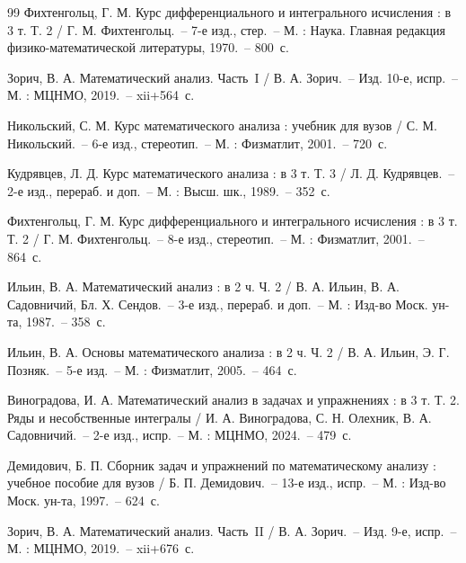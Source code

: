\documentclass[coursework, och, times]{SCWorks1}
\begin{document}
%

\begin{thebibliography}{99}
Фихтенгольц, Г. М. Курс дифференциального и интегрального исчисления : в 3 т. Т. 2 / Г. М. Фихтенгольц.~-- 7-е изд., стер.~-- М. : Наука. Главная редакция физико-математической литературы, 1970.~-- 800~с.

Зорич, В. А. Математический анализ. Часть~I / В. А. Зорич.~-- Изд. 10-е, испр.~-- М. : МЦНМО, 2019.~-- xii+564~с.

Никольский, С. М. Курс математического анализа : учебник для вузов / С. М. Никольский.~-- 6-е изд., стереотип.~-- М. : Физматлит, 2001.~-- 720~с.

Кудрявцев, Л. Д. Курс математического анализа : в 3 т. Т. 3 / Л. Д. Кудрявцев.~-- 2-е изд., перераб. и доп.~-- М. : Высш. шк., 1989.~-- 352~с.

Фихтенгольц, Г. М. Курс дифференциального и интегрального исчисления : в 3 т. Т. 2 / Г. М. Фихтенгольц.~-- 8-е изд., стереотип.~-- М. : Физматлит, 2001.~-- 864~с.

Ильин, В. А. Математический анализ : в 2 ч. Ч. 2 / В. А. Ильин, В. А. Садовничий, Бл. Х. Сендов.~-- 3-е изд., перераб. и доп.~-- М. : Изд-во Моск. ун-та, 1987.~-- 358~с.

Ильин, В. А. Основы математического анализа : в 2 ч. Ч. 2 / В. А. Ильин, Э. Г. Позняк.~-- 5-е изд.~-- М. : Физматлит, 2005.~-- 464~с.

Виноградова, И. А. Математический анализ в задачах и упражнениях : в 3 т. Т. 2. Ряды и несобственные интегралы / И. А. Виноградова, С. Н. Олехник, В. А. Садовничий.~-- 2-е изд., испр.~-- М. : МЦНМО, 2024.~-- 479~с.

Демидович, Б. П. Сборник задач и упражнений по математическому анализу : учебное пособие для вузов / Б. П. Демидович.~-- 13-е изд., испр.~-- М. : Изд-во Моск. ун-та, 1997.~-- 624~с.

Зорич, В. А. Математический анализ. Часть~II / В. А. Зорич.~-- Изд. 9-е, испр.~-- М. : МЦНМО, 2019.~-- xii+676~с.
\end{thebibliography}


%
%
%

\end{document}
